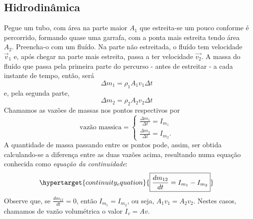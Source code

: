 \documentclass[physicsII_notes.tex]{subfiles}
\begin{document}
\subsection{Hidrodinâmica}
Pegue um tubo, com área na parte maior \(A_{1}\) que estreita-se um pouco conforme é percorrido, formando quase uma garrafa, com a ponta mais estreita tendo área \(A_{2}\).
Preencha-o com um fluído. Na parte não estreitada, o fluído tem velocidade \(\vec{v}_{1}\) e, após chegar na parte mais estreita, passa a ter velocidade \(\vec{v_{2}}\).
A massa do fluído que passa pela primeira parte do percurso - antes de estreitar - a cada instante de tempo, então, será
\[
	\Delta m_{1} = \rho_{1}A_{1}v_{1}\Delta t
\]
e, pela segunda parte,
\[
	\Delta m_{2} = \rho_{2}A_{2}v_{2}\Delta t
\]
Chamamos as vazões de massas nos pontos respectivos por
\[
	\text{vazão massica} = \left\{\begin{array}{ll}
		\frac{\Delta m_{1}}{\Delta t} = I_{m_{1}} \\
		\frac{\Delta m_{2}}{\Delta t} = I_{m_{2}}.
	\end{array}\right.
\]
A quantidade de massa passando entre os pontos pode, assim, ser obtida calculando-se a diferença entre as duas vazões acima,
resultando numa equação conhecida como \textit{equação da continuidade}:
\[
	\hypertarget{continuity_equation}{\boxed{\frac{dm_{12}}{dt} = I_{m_{1}}-I_{m_{2}}}}
\]
Observe que, se \(\frac{dm_{12}}{dt} = 0\), então \(I_{m_{1}} = I_{m_{2}}\), ou seja, \(A_{1}v_{1}=A_{2}v_{2}\). Nestes casos, chamamos de vazão
volumétrica o valor \(I_{v}=Av\).
\end{document}
